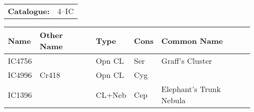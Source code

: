 \begin{tabular}{ p{0.9in} p{1.3in}}
{\bf Catalogue:} & 4--IC \\ 
\end{tabular}
\begin{longtable}{ p{0.7in}  p{1.0in}  p{0.6in}  p{0.9in}  p{5.1in} }
\hline 
{\bf Name} & {\bf Other Name} & {\bf Type} & {\bf Cons} & {\bf Common Name} \\ 
\hline 
IC4756 &  & Opn CL & Ser & Graff's Cluster \\ 
IC4996 & Cr418 & Opn CL & Cyg &  \\ 
IC1396 &  & CL+Neb & Cep & Elephant's Trunk Nebula \\ 
\hline 
\end{longtable} 
